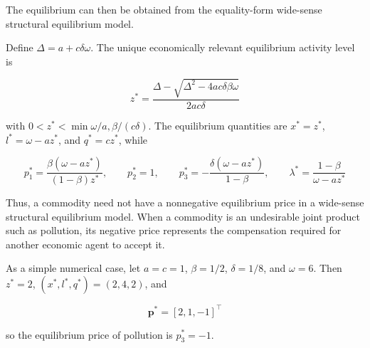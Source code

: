 \documentclass[
  letterpaper,
  DIV=11,
  numbers=noendperiod]{scrreprt}
\begin{document}
The equilibrium can then be obtained from the equality-form wide-sense
structural equilibrium model.

Define \(\Delta=a+c\delta\omega\). The unique economically relevant
equilibrium activity level is

\[
z^*=
\frac{\Delta-\sqrt{\Delta^2-4ac\delta\beta\omega}}
{2ac\delta}
\]

with \(0<z^*<\min{\omega/a,\beta/(c\delta)}\). The equilibrium
quantities are \(x^*=z^*\), \(l^*=\omega-az^*\), and \(q^*=cz^*\), while

\[
p_1^*=
\frac{\beta(\omega-az^*)}{(1-\beta)z^*},
\qquad
p_2^*=1,
\qquad
p_3^*=
-\frac{\delta(\omega-az^*)}{1-\beta},
\qquad
\lambda^*=
\frac{1-\beta}{\omega-az^*}
\]

Thus, a commodity need not have a nonnegative equilibrium price in a
wide-sense structural equilibrium model. When a commodity is an
undesirable joint product such as pollution, its negative price
represents the compensation required for another economic agent to
accept it.

As a simple numerical case, let \(a=c=1\), \(\beta=1/2\),
\(\delta=1/8\), and \(\omega=6\). Then \(z^*=2\),
\((x^*,l^*,q^*)=(2,4,2)\), and

\[
\mathbf p^*=[2,1,-1]^\top
\]

so the equilibrium price of pollution is \(p_3^*=-1\).
\end{document}
